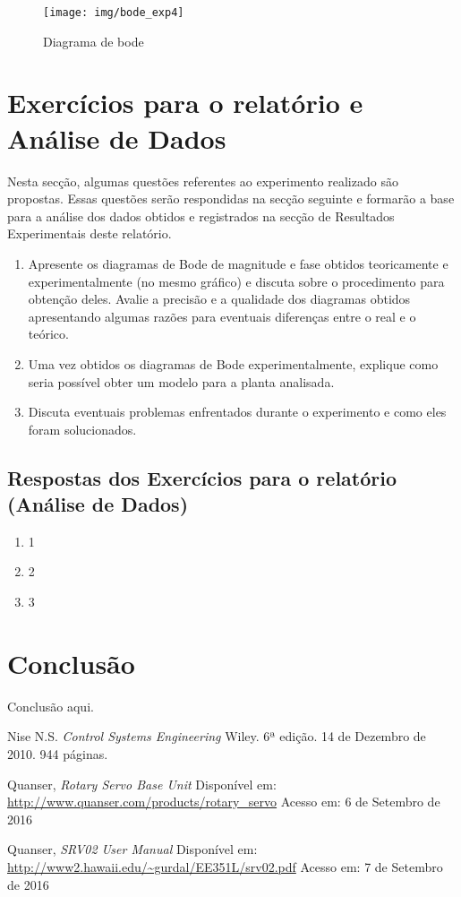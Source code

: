 \documentclass[a4paper,12pt]{article}
\begin{document}
\begin{figure}[H]
\centering
\texttt{[image: img/bode\_exp4]}
\caption{Diagrama de bode}
\label{fig:bode}
\end{figure}


\section{Exercícios para o relatório e Análise de Dados}
Nesta secção, algumas questões referentes ao experimento realizado são propostas. Essas questões serão respondidas na secção seguinte e formarão a base para a análise dos dados obtidos e registrados na secção de Resultados Experimentais deste relatório.

\begin{enumerate}
    \item Apresente os diagramas de Bode de magnitude e fase obtidos teoricamente e experimentalmente (no mesmo gráfico) e discuta sobre o procedimento para obtenção deles. Avalie a precisão e a qualidade dos diagramas obtidos apresentando algumas razões para eventuais diferenças entre o real e o teórico.
    \item  Uma vez obtidos os diagramas de Bode experimentalmente, explique como seria possível obter um modelo para a planta analisada.
    \item  Discuta eventuais problemas enfrentados durante o experimento e como eles foram solucionados.
\end{enumerate}

\subsection{Respostas dos Exercícios para o relatório (Análise de Dados)}
\begin{enumerate}
    \item 1
    \item 2
    \item 3
\end{enumerate}

\section{Conclusão}

Conclusão aqui.

\begin{thebibliography}{8}
Nise N.S.
\emph{Control Systems Engineering} Wiley. 6ª edição. 14 de Dezembro de 2010. 944 páginas.

Quanser,
\emph{Rotary Servo Base Unit}
Disponível em: \url{http://www.quanser.com/products/rotary_servo}
Acesso em: 6 de Setembro de 2016

Quanser,
\emph{SRV02 User Manual}
Disponível em: \url{http://www2.hawaii.edu/~gurdal/EE351L/srv02.pdf}
Acesso em: 7 de Setembro de 2016


\end{thebibliography}
\end{document}

